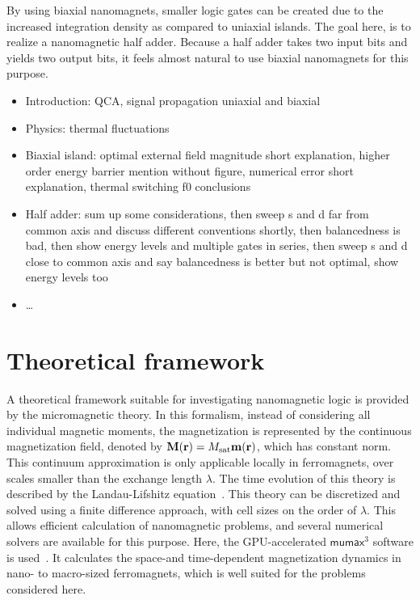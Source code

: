 \documentclass[twocolumn]{phdsymp}
\newcommand{\mumax}{$\mathsf{mumax}^3$}
\begin{document}
By using biaxial nanomagnets, smaller logic gates can be created due to the increased integration density as compared to uniaxial islands. The goal here, is to realize a nanomagnetic half adder. Because a half adder takes two input bits and yields two output bits, it feels almost natural to use biaxial nanomagnets for this purpose.

\begin{itemize}
\item Introduction: QCA, signal propagation uniaxial and biaxial
\item Physics: thermal fluctuations
\item Biaxial island: optimal external field magnitude short explanation, higher order energy barrier mention without figure, numerical error short explanation, thermal switching f0 conclusions
\item Half adder:  sum up some considerations, then sweep s and d far from common axis and discuss different conventions shortly, then balancedness is bad, then show energy levels and multiple gates in series, then sweep s and d close to common axis and say balancedness is better but not optimal, show energy levels too
\item \ldots{}
\end{itemize}

\section{Theoretical framework}
A theoretical framework suitable for investigating nanomagnetic logic is provided by the micromagnetic theory. In this formalism, instead of considering all individual magnetic moments, the magnetization is represented by the continuous magnetization field, denoted by $\vb{M}(\vb{r})=M_{\mathrm{sat}} \vb{m}(\vb{r})$, which has constant norm. This continuum approximation is only applicable locally in ferromagnets, over scales smaller than the exchange length $\lambda$. The time evolution of this theory is described by the Landau-Lifshitz equation~\cite{lifdau}. This theory can be discretized and solved using a finite difference approach, with cell sizes on the order of $\lambda$. This allows efficient calculation of nanomagnetic problems, and several numerical solvers are available for this purpose. Here, the GPU-accelerated \mumax{} software is used~\cite{MuMax3}. It calculates the space-and time-dependent magnetization dynamics in nano- to macro-sized ferromagnets, which is well suited for the problems considered here.
\end{document}
